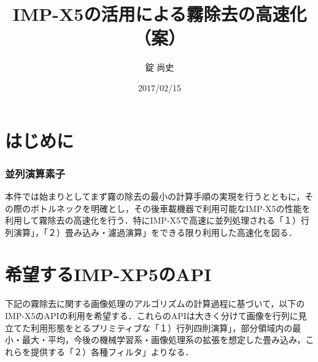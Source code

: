\documentclass{jsarticle}
\title{IMP-X5の活用による霧除去の高速化（案）}
\author{錠 尚史}
\date{2017/02/15}
\begin{document}
\maketitle



\part{はじめに}
\label{はじめに}


\section{並列演算素子}
\label{並列演算素子}

本件では始まりとしてまず霧の除去の最小の計算手順の実現を行うとともに，その際のボトルネックを明確とし，その後車載機器で利用可能なIMP-X5の性能を利用して霧除去の高速化を行う．特にIMP-X5で高速に並列処理される「１）行列演算」，「２）畳み込み・濾過演算」をできる限り利用した高速化を図る．


\part{希望するIMP-XP5のAPI}
\label{希望するIMP-XP5のAPI}

下記の霧除去に関する画像処理のアルゴリズムの計算過程に基づいて，以下のIMP-X5のAPIの利用を希望する．これらのAPIは大きく分けて画像を行列に見立てた利用形態をとるプリミティブな「１）行列四則演算」，部分領域内の最小・最大・平均，今後の機械学習系・画像処理系の拡張を想定した畳み込み，これらを提供する「２）各種フィルタ」よりなる．
\end{document}
